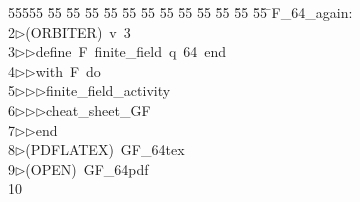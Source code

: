 %
%
\begin{tabbing}
55555 \= 55 \= 55 \= 55 \= 55 \= 55 \= 55 \= 55 \= 55 \= 55 \= 55 \= 55 \= 55 \= \>F\_64\_again:\\[0pt]
2\>$\triangleright$\>(ORBITER)\ v\ 3\ \\[0pt]
3\>$\triangleright$\>$\triangleright$\>define\ F\ finite\_field\ q\ 64\ end\ \\[0pt]
4\>$\triangleright$\>$\triangleright$\>with\ F\ do\ \\[0pt]
5\>$\triangleright$\>$\triangleright$\>$\triangleright$\>finite\_field\_activity\ \\[0pt]
6\>$\triangleright$\>$\triangleright$\>$\triangleright$\>cheat\_sheet\_GF\ \\[0pt]
7\>$\triangleright$\>$\triangleright$\>end\\[0pt]
8\>$\triangleright$\>(PDFLATEX)\ GF\_64tex\\[0pt]
9\>$\triangleright$\>(OPEN)\ GF\_64pdf\\[0pt]
10\>\end{tabbing}
